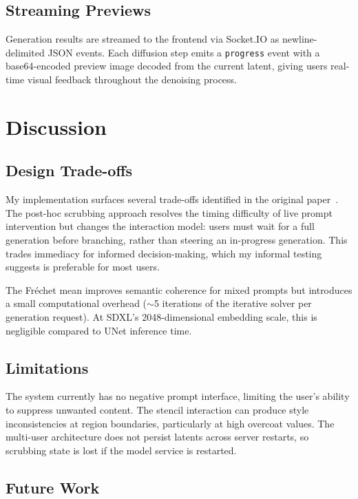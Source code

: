 \documentclass[sigconf]{acmart}
\begin{document}
\subsection{Streaming Previews}

Generation results are streamed to the frontend via Socket.IO as
newline-delimited JSON events. Each diffusion step emits a \texttt{progress}
event with a base64-encoded preview image decoded from the current latent,
giving users real-time visual feedback throughout the denoising process.

\section{Discussion}

\subsection{Design Trade-offs}

My implementation surfaces several trade-offs identified in the
original paper~\cite{chung2023promptpaint}. The post-hoc scrubbing approach
resolves the timing difficulty of live prompt intervention but changes the
interaction model: users must wait for a full generation before branching,
rather than steering an in-progress generation. This trades immediacy for
informed decision-making, which my informal testing suggests is preferable
for most users.

The Fréchet mean improves semantic coherence for mixed prompts but introduces
a small computational overhead ($\sim$5 iterations of the iterative solver
per generation request). At SDXL's 2048-dimensional embedding scale, this
is negligible compared to UNet inference time.

\subsection{Limitations}

The system currently has no negative prompt interface, limiting the user's
ability to suppress unwanted content. The stencil interaction can produce
style inconsistencies at region boundaries, particularly at high overcoat
values. The multi-user architecture does not persist latents across server
restarts, so scrubbing state is lost if the model service is restarted.

\subsection{Future Work}
\end{document}
